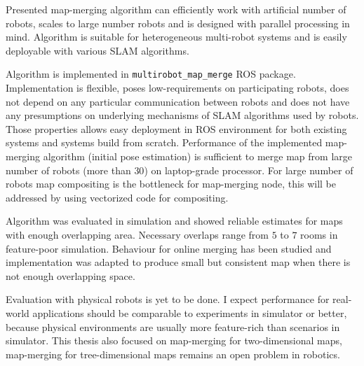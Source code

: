 
Presented map-merging algorithm can efficiently work with artificial number of robots, scales to large number robots and is designed with parallel processing in mind. Algorithm is suitable for heterogeneous multi-robot systems and is easily deployable with various \gls{SLAM} algorithms.

Algorithm is implemented in \texttt{multirobot\_map\_merge} \gls{ROS} package. Implementation is flexible, poses low-requirements on participating robots, does not depend on any particular communication between robots and does not have any presumptions on underlying mechanisms of \gls{SLAM} algorithms used by robots. Those properties allows easy deployment in \gls{ROS} environment for both existing systems and systems build from scratch. Performance of the implemented map-merging algorithm (initial pose estimation) is sufficient to merge map from large number of robots (more than $30$) on laptop-grade processor. For large number of robots map compositing is the bottleneck for map-merging node, this will be addressed by using vectorized code for compositing.

Algorithm was evaluated in simulation and showed reliable estimates for maps with enough overlapping area. Necessary overlaps range from $5$ to $7$ rooms in feature-poor simulation. Behaviour for online merging has been studied and implementation was adapted to produce small but consistent map when there is not enough overlapping space.

Evaluation with physical robots is yet to be done. I expect performance for real-world applications should be comparable to experiments in simulator or better, because physical environments are usually more feature-rich than scenarios in simulator. This thesis also focused on map-merging for two-dimensional maps, map-merging for tree-dimensional maps remains an open problem in robotics.

